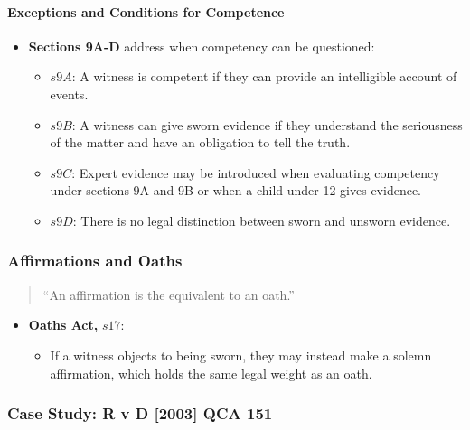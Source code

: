\paragraph{Exceptions and Conditions for
Competence}\label{exceptions-and-conditions-for-competence}

\begin{itemize}
\tightlist
\item
  \textbf{Sections 9A-D} address when competency can be questioned:

  \begin{itemize}
  \tightlist
  \item
    \(s9A\): A witness is competent if they can provide an intelligible
    account of events.
  \item
    \(s9B\): A witness can give sworn evidence if they understand the
    seriousness of the matter and have an obligation to tell the truth.
  \item
    \(s9C\): Expert evidence may be introduced when evaluating
    competency under sections 9A and 9B or when a child under 12 gives
    evidence.
  \item
    \(s9D\): There is no legal distinction between sworn and unsworn
    evidence.
  \end{itemize}
\end{itemize}

\subsubsection{Affirmations and Oaths}\label{affirmations-and-oaths}

\begin{quote}
``An affirmation is the equivalent to an oath.''
\end{quote}

\begin{itemize}
\tightlist
\item
  \textbf{Oaths Act,} \(s17\):

  \begin{itemize}
  \tightlist
  \item
    If a witness objects to being sworn, they may instead make a solemn
    affirmation, which holds the same legal weight as an oath.
  \end{itemize}
\end{itemize}

\subsubsection{Case Study: R v D {[}2003{]} QCA
151}\label{case-study-r-v-d-2003-qca-151}

